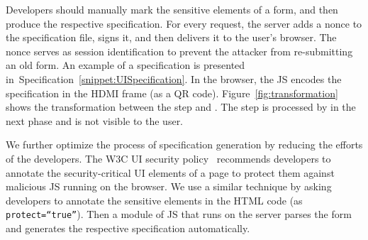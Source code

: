 Developers should manually mark the sensitive elements of a form, and then produce the respective specification.
For every request, the server adds a nonce to the specification file, signs it, and then delivers it to the user's browser. The nonce serves as session identification to prevent the attacker from re-submitting an old form.
An example of a specification is presented in~Specification~\ref{snippet:UISpecification}. 
In the browser, the \name JS encodes the specification in the HDMI frame (as a QR code). 
Figure~\ref{fig:transformation} shows the transformation between the step \one and \two. The step \two is processed by \device in the next phase and is not visible to the user.

We further optimize the process of specification generation by reducing the efforts of the developers. The W3C UI security policy~\cite{w3c_spec} recommends developers to annotate the security-critical UI elements of a page to protect them against malicious JS running on the browser. We use a similar technique by asking developers to annotate the sensitive elements in the HTML code (as \texttt{protect=``true''}). Then a module of \name JS that runs on the server parses the form and generates the respective specification automatically.





